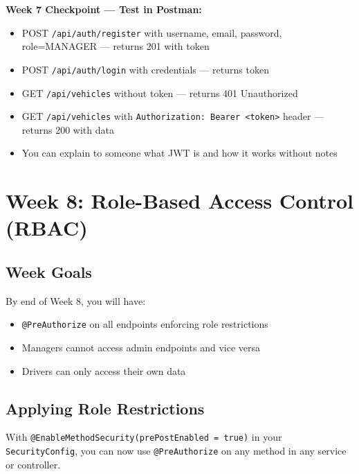 \documentclass[12pt,a4paper]{report}
\newcommand{\code}[1]{\texttt{\textcolor{keywordblue}{#1}}}
\newcommand{\apipath}[1]{\texttt{\textcolor{dangerred}{#1}}}
\begin{document}
\begin{tcolorbox}[successbox]
\textbf{Week 7 Checkpoint --- Test in Postman:}
\begin{itemize}
  \item[$\checkmark$] POST \apipath{/api/auth/register} with username, email, password, role=MANAGER --- returns 201 with token
  \item[$\checkmark$] POST \apipath{/api/auth/login} with credentials --- returns token
  \item[$\checkmark$] GET \apipath{/api/vehicles} without token --- returns 401 Unauthorized
  \item[$\checkmark$] GET \apipath{/api/vehicles} with \code{Authorization: Bearer <token>} header --- returns 200 with data
  \item[$\checkmark$] You can explain to someone what JWT is and how it works without notes
\end{itemize}
\end{tcolorbox}

\chapter{Week 8: Role-Based Access Control (RBAC)}

\section{Week Goals}

By end of Week 8, you will have:
\begin{itemize}
  \item \code{@PreAuthorize} on all endpoints enforcing role restrictions
  \item Managers cannot access admin endpoints and vice versa
  \item Drivers can only access their own data
\end{itemize}

\section{Applying Role Restrictions}

With \code{@EnableMethodSecurity(prePostEnabled = true)} in your \code{SecurityConfig}, you can now use \code{@PreAuthorize} on any method in any service or controller.
\end{document}
